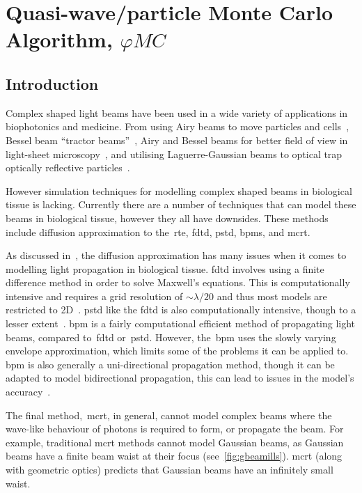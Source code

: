 \chapter{Quasi-wave/particle Monte Carlo Algorithm, \texorpdfstring{$\varphi MC$}{phiMC}}\label{sec:phase}

\section{Introduction}\label{sec:besintro}

Complex shaped light beams have been used in a wide variety of applications in biophotonics and medicine.
From using Airy beams to move particles and cells~\cite{baumgartl2008optically}, Bessel beam ``tractor beams''~\cite{ruffner2012optical}, Airy and Bessel beams for better field of view in light-sheet microscopy~\cite{vettenburg2014light}, and utilising Laguerre-Gaussian beams to optical trap optically reflective particles~\cite{simpson1996optical}.


However simulation techniques for modelling complex shaped beams in biological tissue is lacking.
Currently there are a number of techniques that can model these beams in biological tissue, however they all have downsides.
These methods include diffusion approximation to the~\gls*{rte}, \gls*{fdtd}, \gls*{pstd}, \gls*{bpms}, and \gls*{mcrt}.

As discussed in~, the diffusion approximation has many issues when it comes to modelling light propagation in biological tissue.
\gls*{fdtd} involves using a finite difference method in order to solve Maxwell's equations.
This is computationally intensive and requires a grid resolution of $\sim \lambda/20$ and thus most models are restricted to 2D~\cite{glaser2016fractal,elmaklizi2015penetration}. 
\gls*{pstd} like the \gls*{fdtd} is also computationally intensive, though to a lesser extent~\cite{glaser2016fractal}.
\Gls*{bpm} is a fairly computational efficient method of propagating light beams, compared to~\gls*{fdtd} or~\gls*{pstd}.
However, the~\gls*{bpm} uses the slowly varying envelope approximation, which limits some of the problems it can be applied to.
\Gls*{bpm} is also generally a uni-directional propagation method, though it can be adapted to model bidirectional propagation, this can lead to issues in the model's accuracy~\cite{van1981beam,glaser2016fractal}.

\medskip

The final method,~\gls*{mcrt}, in general, cannot model complex beams where the wave-like behaviour of photons is required to form, or propagate the beam.
For example, traditional \gls*{mcrt} methods cannot model Gaussian beams, as Gaussian beams have a finite beam waist at their focus (see~\cref{fig:gbeamills}).
\Gls*{mcrt} (along with geometric optics) predicts that Gaussian beams have an infinitely small waist.

